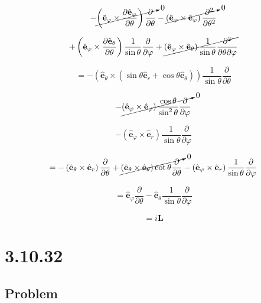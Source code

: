 \documentclass[12pt]{article}
\begin{document}
\[
    - \cancelto{0}{\left(\hat{\mathbf{e}}_\varphi \times \frac{\partial \hat{\mathbf{e}}_\varphi}{\partial \theta}\right)
        \frac{\partial}{\partial \theta}}
    - \cancelto{0}{\left(\hat{\mathbf{e}}_\varphi \times \hat{\mathbf{e}}_\varphi\right)
        \frac{\partial^2}{\partial \theta^2}}
\]

\[
    + \left(\hat{\mathbf{e}}_\varphi \times \frac{\partial \hat{\mathbf{e}}_\theta}{\partial \theta}\right)
    \frac{1}{\sin{\theta}} \frac{\partial}{\partial \varphi}
    + \cancel{\left(\hat{\mathbf{e}}_\varphi \times \hat{\mathbf{e}}_\theta\right)
        \frac{1}{\sin{\theta}} \frac{\partial^2}{\partial \theta \partial \varphi}}
\]

\[
    = - \left(
    \hat{\mathbf{e}}_\theta \times \left(\sin \theta \hat{\mathbf{e}}_r + \cos \theta \hat{\mathbf{e}}_\theta\right)
    \right)
    \frac{1}{\sin{\theta}} \frac{\partial}{\partial \theta}
\]

\[
    - \cancelto{0}{\left(\hat{\mathbf{e}}_\varphi \times \hat{\mathbf{e}}_\varphi\right)
    \frac{\cos{\theta}}{\sin^2{\theta}} \frac{\partial}{\partial \varphi}}
\]

\[
    - \left(\hat{\mathbf{e}}_\varphi \times \hat{\mathbf{e}}_r\right)
    \frac{1}{\sin{\theta}} \frac{\partial}{\partial \varphi}
\]

\[
    = - \left(\hat{\mathbf{e}}_\theta \times \hat{\mathbf{e}}_r\right)
    \frac{\partial}{\partial \theta}
    + \cancelto{0}{\left(\hat{\mathbf{e}}_\theta \times \hat{\mathbf{e}}_\theta\right)
    \cot{\theta} \frac{\partial}{\partial \theta}}
    - \left(\hat{\mathbf{e}}_\varphi \times \hat{\mathbf{e}}_r\right)
    \frac{1}{\sin{\theta}} \frac{\partial}{\partial \varphi}
\]

\[
    = \hat{\mathbf{e}}_\varphi \frac{\partial}{\partial \theta}
    - \hat{\mathbf{e}}_\theta \frac{1}{\sin{\theta}} \frac{\partial}{\partial \varphi}
\]

\[
  = i \textbf{L}   
\]

\section{3.10.32}

\subsection{Problem}
\end{document}
